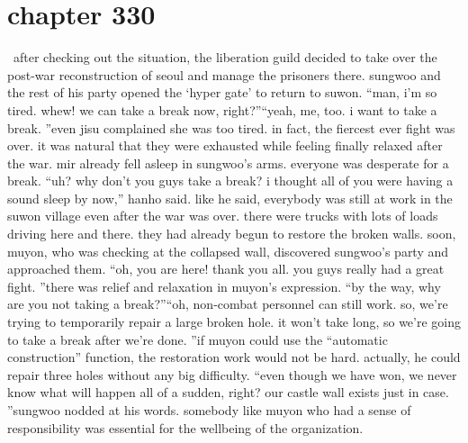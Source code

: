 \section{chapter 330}






 after checking out the situation, the liberation guild decided to take over the post-war reconstruction of seoul and manage the prisoners there.
sungwoo and the rest of his party opened the ‘hyper gate’ to return to suwon.
“man, i’m so tired.
 whew! we can take a break now, right?”“yeah, me, too.
 i want to take a break.
”even jisu complained she was too tired.
 in fact, the fiercest ever fight was over.
 it was natural that they were exhausted while feeling finally relaxed after the war.
mir already fell asleep in sungwoo’s arms.
 everyone was desperate for a break.
“uh? why don’t you guys take a break? i thought all of you were having a sound sleep by now,” hanho said.
 like he said, everybody was still at work in the suwon village even after the war was over.
 there were trucks with lots of loads driving here and there.
 they had already begun to restore the broken walls.
soon, muyon, who was checking at the collapsed wall, discovered sungwoo’s party and approached them.
“oh, you are here! thank you all.
 you guys really had a great fight.
”there was relief and relaxation in muyon’s expression.
“by the way, why are you not taking a break?”“oh, non-combat personnel can still work.
 so, we’re trying to temporarily repair a large broken hole.
 it won’t take long, so we’re going to take a break after we’re done.
”if muyon could use the “automatic construction” function, the restoration work would not be hard.
 actually, he could repair three holes without any big difficulty.
“even though we have won, we never know what will happen all of a sudden, right? our castle wall exists just in case.
”sungwoo nodded at his words.
 somebody like muyon who had a sense of responsibility was essential for the wellbeing of the organization.

